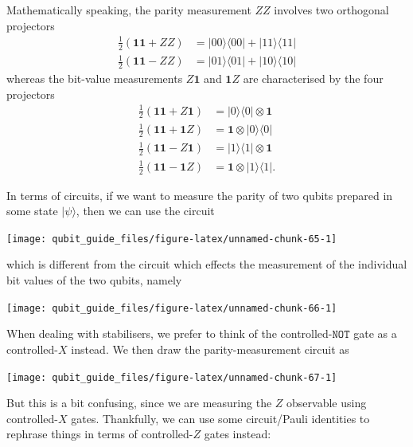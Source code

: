 \documentclass[fleqn,a4paper]{article}
\theoremstyle{definition}
\theoremstyle{definition}
\theoremstyle{definition}
\theoremstyle{definition}
\theoremstyle{remark}
\begin{document}
Mathematically speaking, the parity measurement \(ZZ\) involves two orthogonal projectors
\[
  \begin{aligned}
    \frac{1}{2}(\mathbf{1}\mathbf{1}+ZZ)
    &= |00\rangle\langle 00|+|11\rangle\langle 11|
  \\\frac{1}{2}(\mathbf{1}\mathbf{1}-ZZ)
    &= |01\rangle\langle 01|+|10\rangle\langle 10|
  \end{aligned}
\]
whereas the bit-value measurements \(Z\mathbf{1}\) and \(\mathbf{1}Z\) are characterised by the four projectors
\[
  \begin{aligned}
    \frac{1}{2}(\mathbf{1}\mathbf{1}+Z\mathbf{1})
    &= |0\rangle\langle 0|\otimes\mathbf{1}
  \\\frac{1}{2}(\mathbf{1}\mathbf{1}+\mathbf{1}Z)
    &= \mathbf{1}\otimes|0\rangle\langle 0|
  \\\frac{1}{2}(\mathbf{1}\mathbf{1}-Z\mathbf{1})
    &= |1\rangle\langle 1|\otimes\mathbf{1}
  \\\frac{1}{2}(\mathbf{1}\mathbf{1}-\mathbf{1}Z)
    &= \mathbf{1}\otimes|1\rangle\langle 1|.
  \end{aligned}
\]

In terms of circuits, if we want to measure the parity of two qubits prepared in some state \(|\psi\rangle\), then we can use the circuit

\begin{center}\texttt{[image: qubit\_guide\_files/figure-latex/unnamed-chunk-65-1]} \end{center}

which is different from the circuit which effects the measurement of the individual bit values of the two qubits, namely

\begin{center}\texttt{[image: qubit\_guide\_files/figure-latex/unnamed-chunk-66-1]} \end{center}

When dealing with stabilisers, we prefer to think of the controlled-\(\texttt{NOT}\) gate as a controlled-\(X\) instead.
We then draw the parity-measurement circuit as

\begin{center}\texttt{[image: qubit\_guide\_files/figure-latex/unnamed-chunk-67-1]} \end{center}

But this is a bit confusing, since we are measuring the \(Z\) observable using controlled-\(X\) gates.
Thankfully, we can use some circuit/Pauli identities to rephrase things in terms of controlled-\(Z\) gates instead:
\end{document}
